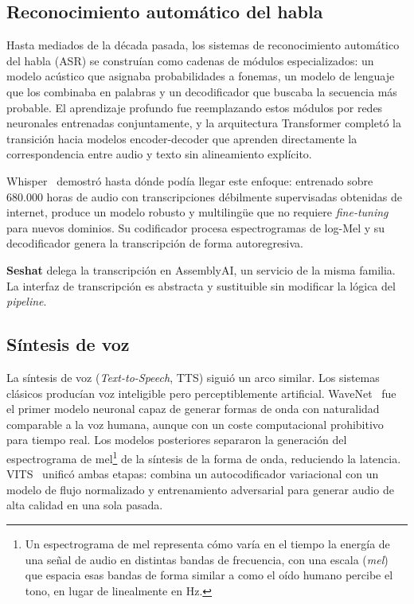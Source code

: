 \subsection{Reconocimiento automático del habla}

Hasta mediados de la década pasada, los sistemas de reconocimiento automático del habla (\ac{ASR})
se construían como cadenas de módulos especializados: un modelo acústico que asignaba
probabilidades a fonemas, un modelo de lenguaje que los combinaba en palabras y un decodificador
que buscaba la secuencia más probable. El aprendizaje profundo fue reemplazando estos módulos por
redes neuronales entrenadas conjuntamente, y la arquitectura Transformer completó la transición
hacia modelos encoder-decoder que aprenden directamente la correspondencia entre audio y texto sin
alineamiento explícito.

Whisper~\cite{radford2023whisper} demostró hasta dónde podía llegar este enfoque: entrenado sobre
680.000 horas de audio con transcripciones débilmente supervisadas obtenidas de internet, produce
un modelo robusto y multilingüe que no requiere \textit{fine-tuning} para nuevos dominios. Su
codificador procesa espectrogramas de log-Mel y su decodificador genera la transcripción de forma
autoregresiva.

\textbf{Seshat} delega la transcripción en AssemblyAI, un servicio de la misma familia. La
interfaz de transcripción es abstracta y sustituible sin modificar la lógica del \textit{pipeline}.

\subsection{Síntesis de voz}

La síntesis de voz (\textit{Text-to-Speech}, TTS) siguió un arco similar. Los sistemas clásicos
producían voz inteligible pero perceptiblemente artificial. WaveNet~\cite{oord2016wavenet} fue el
primer modelo neuronal capaz de generar formas de onda con naturalidad comparable a la voz humana,
aunque con un coste computacional prohibitivo para tiempo real. Los modelos posteriores separaron
la generación del espectrograma de mel\footnote{%
  Un espectrograma de mel representa cómo varía en el tiempo la energía de una señal de audio en
  distintas bandas de frecuencia, con una escala (\textit{mel}) que espacia esas bandas de forma
  similar a como el oído humano percibe el tono, en lugar de linealmente en Hz.%
} de la síntesis de la forma de onda, reduciendo la latencia.
VITS~\cite{kim2021vits} unificó ambas etapas: combina un  autocodificador variacional con un modelo
de flujo normalizado y entrenamiento adversarial para generar audio de alta calidad en una sola pasada.

